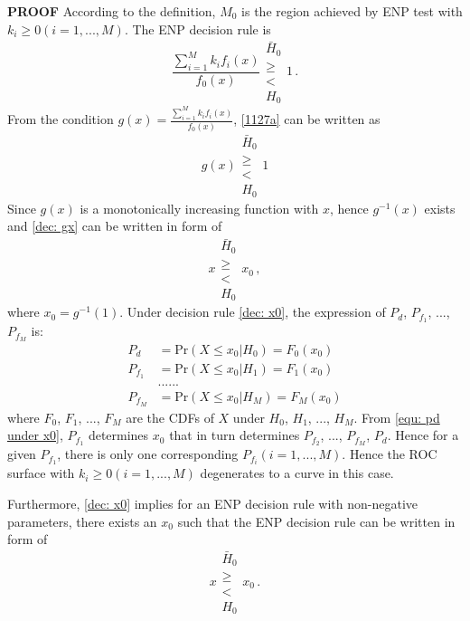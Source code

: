   \noindent \textbf{PROOF}
  According to the definition, $M_0$ is the region achieved by ENP test with $k_i \geq 0 (i=1, ..., M)$. The ENP decision rule is
  \begin{equation}
	\label{1127a}
	\frac{\sum_{i=1}^{M}k_if_i(x)}{f_0(x)} \substack{\bar{H}_0 \\\geq\\< \\H_0}1\,.
  \end{equation}
  From the condition $g(x) = \frac{\sum_{i=1}^{M}k_if_i(x)}{f_0(x)} $, \eqref{1127a} can be written as 
  \begin{equation}
	\label{dec: gx}
	g(x)\substack{\bar{H}_0 \\\geq\\< \\H_0}1
  \end{equation}
  Since $g(x)$ is a monotonically increasing function with $x$, hence $g^{-1}(x)$ exists and \eqref{dec: gx} can be written in form of 
  \begin{equation}
	\label{dec: x0}
	x\substack{\bar{H}_0 \\\geq\\< \\H_0}x_0\,,
  \end{equation}
  where $x_0 = g^{-1}(1)$.
  Under decision rule \eqref{dec: x0}, the expression of $P_d$, $P_{f_1}$, ..., $P_{f_M}$ is: 
  \begin{equation}
	\begin{split}
	  \label{equ: pd under x0}
	  P_d &= \text{Pr}(X \leq x_0 | H_0) = F_0(x_0)\\
	  P_{f_1} &= \text{Pr}(X \leq x_0 | H_1) = F_1(x_0)\\
	  &......\\
	  P_{f_M} &= \text{Pr}(X \leq x_0 | H_M) = F_M(x_0)
	\end{split}
  \end{equation}
  where $F_0$, $F_1$, ..., $F_M$ are the CDFs of $X$ under $H_0$, $H_1$, ..., $H_M$. From \eqref{equ: pd under x0}, $P_{f_1}$ determines $x_0$ that in turn determines $P_{f_2}$, ..., $P_{f_M}$, $P_d$. Hence for a given $P_{f_1}$, there is only one corresponding $P_{f_i} (i= 1, ..., M)$. Hence the ROC surface with $k_i \geq 0 (i = 1, ..., M)$ degenerates to a curve in this case.

  Furthermore, \eqref{dec: x0}  implies for an ENP decision rule with non-negative parameters, there exists an $x_0$ such that the ENP decision rule can be written in form of 
  \begin{equation}
	\label{1125 dec: x0}
	x\substack{\bar{H}_0 \\\geq\\< \\H_0}x_0\,.
  \end{equation}


